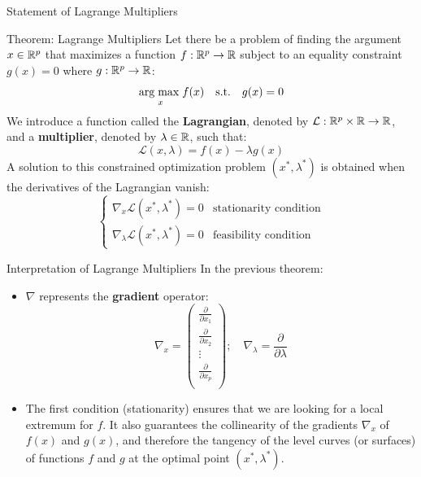 \begin{frame}{Statement of Lagrange Multipliers}
	\begin{block}{Theorem: Lagrange Multipliers}
		Let there be a problem of finding the argument $x \in \mathbb{R}^p$ that maximizes a function $f: \mathbb{R}^p \to \mathbb{R}$ subject to an equality constraint $g(x) = 0$ where $g: \mathbb{R}^p \to \mathbb{R}$:
		\begin{equation}
			\underset{x}{\operatorname{arg\;max}\;} f(x) \quad \text{s.t.} \quad g(x) = 0
			\nonumber
		\end{equation}
		We introduce a function called the \textbf{Lagrangian}, denoted by $\mathcal{L}: \mathbb{R}^p \times \mathbb{R} \to \mathbb{R}$, and a \textbf{multiplier}, denoted by $\lambda \in \mathbb{R}$, such that:
		\begin{equation}
			\mathcal{L}(x, \lambda) = f(x) - \lambda g(x)
			\nonumber
		\end{equation}
		A solution to this constrained optimization problem $(x^*, \lambda^*)$ is obtained when the derivatives of the Lagrangian vanish:
		\begin{equation}
			\begin{cases}
				\nabla_x \mathcal{L}(x^*, \lambda^*) = 0          & \text{stationarity condition} \\
				\nabla_{\lambda} \mathcal{L}(x^*, \lambda^*) = 0  & \text{feasibility condition}
				\nonumber
			\end{cases}
		\end{equation}
	\end{block}
\end{frame}

\begin{frame}{Interpretation of Lagrange Multipliers}
	In the previous theorem:
	\begin{itemize}
		\item $\nabla$ represents the \textbf{gradient} operator:
		\begin{equation}
			\nabla_x = \begin{pmatrix}
				\frac{\partial}{\partial{x_1}} \\
				\frac{\partial}{\partial{x_2}} \\
				\vdots \\
				\frac{\partial}{\partial{x_p}} \\
			\end{pmatrix}; \quad \nabla_{\lambda} = \frac{\partial}{\partial{\lambda}}
			\nonumber
		\end{equation}
		\pause
		\item The first condition (stationarity) ensures that we are looking for a local extremum for $f$. It also guarantees the collinearity of the gradients $\nabla_x$ of $f(x)$ and $g(x)$, and therefore the tangency of the level curves (or surfaces) of functions $f$ and $g$ at the optimal point $(x^*, \lambda^*)$.
	\end{itemize}
\end{frame}

